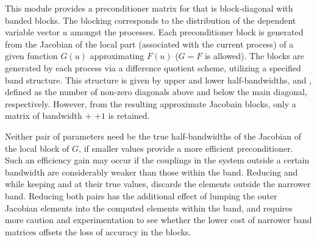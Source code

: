 This module provides a preconditioner matrix for {\kinsol} that
is block-diagonal with banded blocks. The blocking corresponds
to the distribution of the dependent variable vector $u$ amongst
the processes. Each preconditioner block is generated from
the Jacobian of the local part (associated with the current
process) of a given function $G(u)$ approximating $F(u)$
($G = F$ is allowed). The blocks are generated by each process via a
difference quotient scheme, utilizing a specified band structure.
This structure is given by upper and lower half-bandwidths, 
and , defined as the number of non-zero diagonals above and
below the main diagonal, respectively.  However, from the resulting
approximate Jacobain blocks, only a matrix of bandwidth  $+$
 $+ 1$ is retained.

Neither pair of parameters need be the true half-bandwidths of the Jacobian
of the local block of $G$, if smaller values provide a more efficient
preconditioner.  Such an efficiency gain may occur if the couplings
in the system outside a certain bandwidth are considerably weaker than
those within the band.  Reducing  and  while keeping
 and  at their true values, discards the elements
outside the narrower band.  Reducing both pairs has the additional
effect of lumping the outer Jacobian elements into the computed elements
within the band, and requires more caution and experimentation to see
whether the lower cost of narrower band matrices offsets the loss of
accuracy in the blocks.

